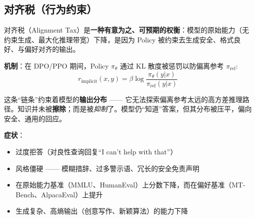 \subsection{对齐税（行为约束）}
\label{alignment-tax-behavioral-constraint}

对齐税（Alignment Tax）是\textbf{一种有意为之、可预期的权衡}：模型的原始能力（无约束生成、最大化推理带宽）下降，是因为 Policy 被约束去生成安全、格式良好、与偏好对齐的输出。

\textbf{机制}：在 DPO/PPO 期间，Policy $\pi_\theta$ 通过 KL 散度被惩罚以防偏离参考 $\pi_{\text{ref}}$:
\begin{equation}
r_{\text{implicit}}(x, y) = \beta \log \frac{\pi_\theta(y|x)}{\pi_{\text{ref}}(y|x)}
\end{equation}

这条“链条”约束着模型的\textbf{输出分布} —— 它无法探索偏离参考太远的高方差推理路径。知识并未被\textbf{擦除}；而是被\emph{抑制}了。模型仍“知道”答案，但其分布被压平，偏向安全、通用的回应。

\textbf{症状}：

\begin{itemize}
  \item 过度拒答（对良性查询回复“I can't help with that”）
  \item 风格僵硬 —— 模糊措辞、过多警示语、冗长的安全免责声明
  \item 在原始能力基准（MMLU、HumanEval）上分数下降，而在偏好基准（MT-Bench、AlpacaEval）上提升
  \item 生成复杂、高熵输出（创意写作、新颖算法）的能力下降
\end{itemize}

